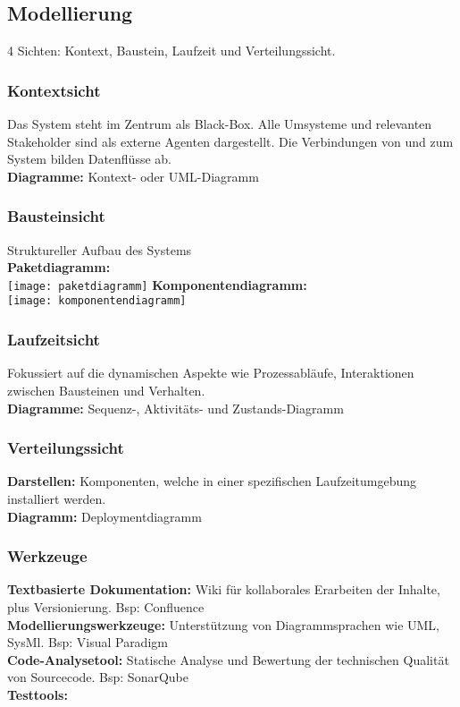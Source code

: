 \subsection{Modellierung}
4 Sichten: Kontext, Baustein, Laufzeit und Verteilungssicht.
\subsubsection{Kontextsicht}
Das System steht im Zentrum als Black-Box. Alle Umsysteme und relevanten Stakeholder sind als externe Agenten dargestellt. Die Verbindungen von und zum System bilden Datenflüsse ab.\\
\textbf{Diagramme:} Kontext- oder UML-Diagramm

\subsubsection{Bausteinsicht}
Struktureller Aufbau des Systems\\
\textbf{Paketdiagramm:}\\
\texttt{[image: paketdiagramm]}
\textbf{Komponentendiagramm:}\\
\texttt{[image: komponentendiagramm]}

\subsubsection{Laufzeitsicht}
Fokussiert auf die dynamischen Aspekte wie Prozessabläufe, Interaktionen zwischen Bausteinen und Verhalten.\\
\textbf{Diagramme:} Sequenz-, Aktivitäts- und Zustands-Diagramm

\subsubsection{Verteilungssicht}
\textbf{Darstellen:} Komponenten, welche in einer spezifischen Laufzeitumgebung installiert werden.\\
\textbf{Diagramm:} Deploymentdiagramm

\subsubsection{Werkzeuge}
\textbf{Textbasierte Dokumentation:} Wiki für kollaborales Erarbeiten der Inhalte, plus Versionierung. Bsp: Confluence\\
\textbf{Modellierungswerkzeuge:} Unterstützung von Diagrammsprachen wie UML, SysMl. Bsp: Visual Paradigm\\
\textbf{Code-Analysetool:} Statische Analyse und Bewertung der technischen Qualität von Sourcecode. Bsp: SonarQube\\
\textbf{Testtools:}

